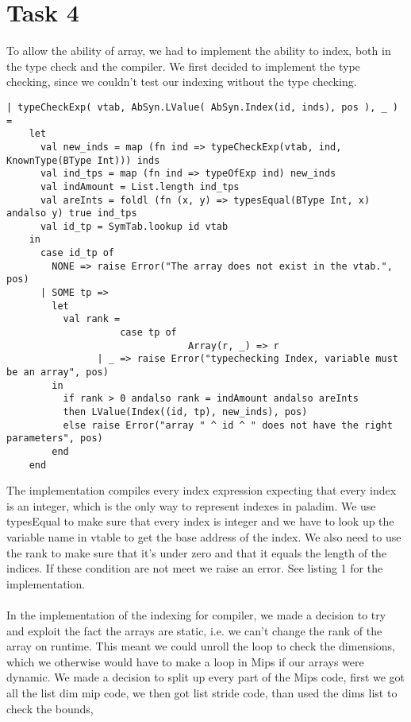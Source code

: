\section{Task 4}

To allow the ability of array, we had to implement the ability to index, both in the type check and the compiler. We first decided to implement
the type checking, since we couldn't test our indexing without the type checking.

\begin{lstlisting}[style=MLStyle, caption=type checking for indexing]		
| typeCheckExp( vtab, AbSyn.LValue( AbSyn.Index(id, inds), pos ), _ ) =
    let 
      val new_inds = map (fn ind => typeCheckExp(vtab, ind, KnownType(BType Int))) inds
      val ind_tps = map (fn ind => typeOfExp ind) new_inds
      val indAmount = List.length ind_tps
      val areInts = foldl (fn (x, y) => typesEqual(BType Int, x) andalso y) true ind_tps
      val id_tp = SymTab.lookup id vtab
    in
      case id_tp of 
        NONE => raise Error("The array does not exist in the vtab.", pos)
      | SOME tp => 
        let
          val rank = 
					case tp of
								Array(r, _) => r
                | _ => raise Error("typechecking Index, variable must be an array", pos)
        in
          if rank > 0 andalso rank = indAmount andalso areInts 
          then LValue(Index((id, tp), new_inds), pos)
          else raise Error("array " ^ id ^ " does not have the right parameters", pos)
        end
    end	
\end{lstlisting}
The implementation compiles every index expression expecting that every index is an integer, which is the only way to represent indexes in 
paladim. We use typesEqual to make sure that every index is integer and we have to look up the variable name in vtable to get the base address of the index. 
We also need to use the rank to make sure that it's under zero and that it equals the length of the indices. If these condition are not meet we raise an error. 
See listing 1 for the implementation.
\\
\\
In the implementation of the indexing for compiler, we made a decision to try and exploit the fact the arrays are static, i.e. we can't change
the rank of the array on runtime. This meant we could unroll the loop to check the dimensions, which we otherwise would have to make a loop in
Mips if our arrays were dynamic. We made a decision to split up every part of the Mips code, 
first we got all the list dim mip code, we then got list stride code, than used the dims list to check the bounds, 
